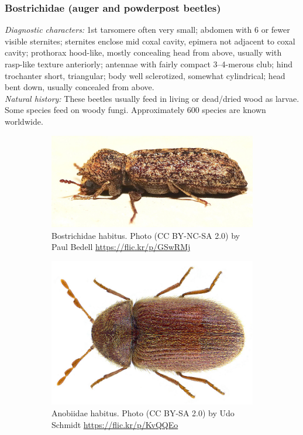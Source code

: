 \documentclass[letterpaper, 11pt]{article}
\begin{document}
\subsubsection{Bostrichidae (auger and powderpost beetles)}
\noindent{}\textit{Diagnostic characters:} 1st tarsomere often very small; abdomen with 6 or fewer visible sternites; sternites enclose mid coxal cavity, epimera not adjacent to coxal cavity; prothorax hood-like, mostly concealing head from above, usually with rasp-like texture anteriorly; antennae with fairly compact 3--4-merous club; hind trochanter short, triangular; body well sclerotized, somewhat cylindrical; head bent down, usually concealed from above.\\

\noindent{}\textit{Natural history:} These beetles usually feed in living or dead/dried wood as larvae. Some species feed on woody fungi. Approximately 600 species are known worldwide.

\begin{figure}[ht!]
  \centering
\begin{subfigure}[ht!]{0.45\textwidth}
    \includegraphics[width=\textwidth]{BostrichidHabitus}
  \caption{Bostrichidae habitus. Photo (CC BY-NC-SA 2.0) by Paul Bedell \url{https://flic.kr/p/GSwRMj}}
  \label{fig:bostrichid}
\end{subfigure}
    \qquad 
\begin{subfigure}[ht!]{0.42\textwidth}
    \includegraphics[width=\textwidth]{AnobiidHabitus}
  \caption{Anobiidae habitus. Photo (CC BY-SA 2.0) by Udo Schmidt \url{https://flic.kr/p/KvQQEo}}
  \label{fig:anobiid}\end{subfigure}
    \caption{}\label{fig:anobiidderm}
\end{figure}
\end{document}
